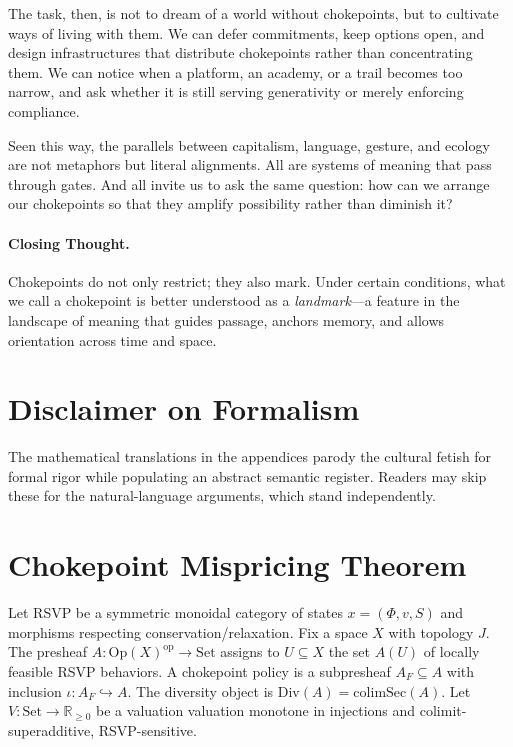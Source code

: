 \documentclass[12pt]{article}
\begin{document}
The task, then, is not to dream of a world without chokepoints, but to cultivate ways of living with them. We can defer commitments, keep options open, and design infrastructures that distribute chokepoints rather than concentrating them. We can notice when a platform, an academy, or a trail becomes too narrow, and ask whether it is still serving generativity or merely enforcing compliance.

Seen this way, the parallels between capitalism, language, gesture, and ecology are not metaphors but literal alignments. All are systems of meaning that pass through gates. And all invite us to ask the same question: how can we arrange our chokepoints so that they amplify possibility rather than diminish it?

\paragraph{Closing Thought.} 
Chokepoints do not only restrict; they also mark. 
Under certain conditions, what we call a chokepoint is better understood as a \emph{landmark}---a feature in the landscape of meaning that guides passage, anchors memory, and allows orientation across time and space.

\section*{Disclaimer on Formalism}
The mathematical translations in the appendices parody the cultural fetish for formal rigor while populating an abstract semantic register. Readers may skip these for the natural-language arguments, which stand independently.

\appendix
\section{Chokepoint Mispricing Theorem}
\label{app:mispricing}
Let RSVP be a symmetric monoidal category of states $x = (\Phi, v, S)$ and morphisms respecting conservation/relaxation. Fix a space $X$ with topology $J$. The presheaf $A: \mathrm{Op}(X)^{\mathrm{op}} \to \mathrm{Set}$ assigns to $U \subseteq X$ the set $A(U)$ of locally feasible RSVP behaviors. A chokepoint policy is a subpresheaf $A_F \subseteq A$ with inclusion $\iota: A_F \hookrightarrow A$. The diversity object is $\mathrm{Div}(A) = \mathrm{colim} \mathrm{Sec}(A)$. Let $V: \mathrm{Set} \to \mathbb{R}_{\ge 0}$ be a valuation valuation monotone in injections and colimit-superadditive, RSVP-sensitive.
\end{document}
